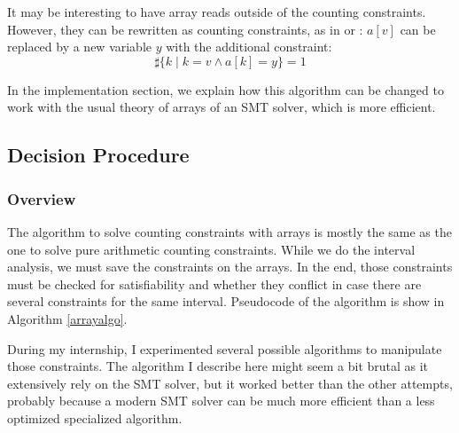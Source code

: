 It may be interesting to have array reads outside of the counting
constraints. However, they can be rewritten as counting constraints, as in
\cite{bradley2006s} or
\cite{AlbertiGP16}: $a[v]$ can be replaced by a new variable $y$ with the additional constraint:
\begin{equation}
\sharp\{k\mid k = v \land a[k] = y\} = 1
\end{equation}

In the implementation section, we explain
how this algorithm can be changed to work with the usual theory of arrays of an
SMT solver, which is more efficient.

\subsection{Decision Procedure}

\subsubsection{Overview}

The algorithm to solve counting constraints with arrays is mostly the
same as the one to solve pure arithmetic counting constraints. While we do the interval analysis,
we must save the constraints on the arrays. In the end, those constraints must be checked for
satisfiability and whether they conflict in case there are several constraints
for the same interval. Pseudocode of the algorithm is show in Algorithm
\ref{arrayalgo}.

During my internship, I experimented several possible algorithms to
manipulate those constraints. The algorithm I describe here might seem a
bit brutal as it extensively rely on the SMT solver, but it
worked better than the other attempts, probably because a modern SMT
solver can be much more efficient than a less optimized specialized
algorithm.

